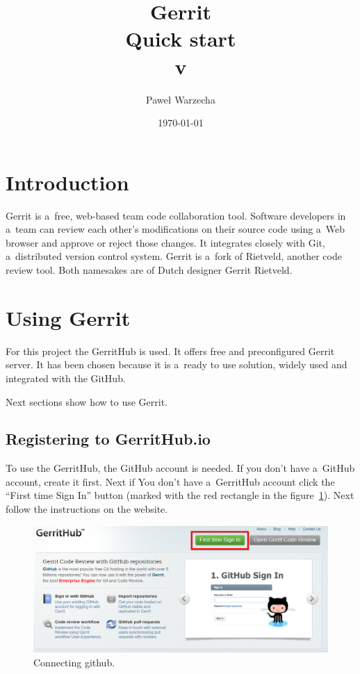 \documentclass{article}
\title{Gerrit \\ Quick start \\ \small{v\version}}
\author{Paweł Warzecha}
\date{\today}
\begin{document}
\maketitle
\newpage

\tableofcontents
\newpage

\section{Introduction}

Gerrit is a~free, web-based team code collaboration tool. Software developers in a~team can review each other's modifications on their source code using a~Web browser and approve or reject those changes. It integrates closely with Git, a~distributed version control system. Gerrit is a~fork of Rietveld, another code review tool. Both namesakes are of Dutch designer Gerrit Rietveld\cite{Gerrit}.

\section{Using Gerrit}

For this project the GerritHub\cite{GerritHub} is used. It offers free and preconfigured Gerrit server. It has been chosen because it is a~ready to use solution, widely used and integrated with the GitHub. 

Next sections show how to use Gerrit.

\subsection{Registering to GerritHub.io}

To use the GerritHub, the GitHub account is needed. If you don't have a~GitHub account, create it first. Next if You don't have a~GerritHub account click the ``First time Sign In'' button (marked with the red rectangle in the figure~\ref{fig:Register}). Next follow the instructions on the website.

\begin{figure}[!ht]
  \centering
  \includegraphics[width=.75\textwidth]{img/RegisterToGerritHub}
  \caption{Connecting github.}
  \label{fig:Register}
\end{figure}
\end{document}
